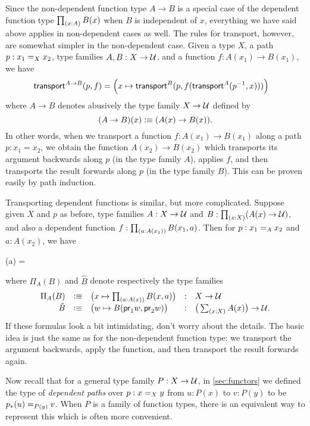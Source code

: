 Since the non-dependent function type $A\to B$ is a special case of the dependent function type $\prd{x:A} B(x)$ when $B$ is independent of $x$, everything we have said above applies in non-dependent cases as well.
The rules for transport, however, are somewhat simpler in the non-dependent case.
Given a type $X$, a path $p:\id[X]{x_1}{x_2}$, type families $A,B:X\to \type$, and a function $f : A(x_1) \to B(x_1)$,  we have
\begin{align}\label{eq:transport-arrow}
  \transfib{A\to B}{p}{f} &=
  \Big(x \mapsto \transfib{B}{p}{f(\transfib{A}{\opp p}{x})}\Big)
\end{align}
where $A\to B$ denotes abusively the type family $X\to \type$ defined by
\[(A\to B)(x) \defeq (A(x)\to B(x)).\]
In other words, when we transport a function $f:A(x_1)\to B(x_1)$ along a path $p:x_1=x_2$, we obtain the function $A(x_2)\to B(x_2)$ which transports its argument backwards along $p$ (in the type family $A$), applies $f$, and then transports the result forwards along $p$ (in the type family $B$).
This can be proven easily by path induction.

Transporting dependent functions is similar, but more complicated.
Suppose given $X$ and $p$ as before, type families $A:X\to \type$ and $B:\prd{x:X} (A(x)\to\type)$, and also a dependent function $f : \prd{a:A(x_1)} B(x_1,a)$.
Then for $p:\id[A]{x_1}{x_2}$ and $a:A(x_2)$, we have
\begin{narrowmultline*}
  (a) = \narrowbreak
\end{narrowmultline*}
where $\Pi_A(B)$ and $\hat{B}$ denote respectively the type families
\begin{equation}\label{eq:transport-arrow-families}
\begin{array}{rclcl}
\Pi_A(B) &\defeq& \big(x\mapsto \prd{a:A(x)} B(x,a) \big) &:& X\to \type\\
\hat{B} &\defeq& \big(w \mapsto B(\proj1w,\proj2w) \big) &:& \big(\sm{x:X} A(x)\big) \to \type.
\end{array}
\end{equation}
If these formulas look a bit intimidating, don't worry about the details.
The basic idea is just the same as for the non-dependent function type: we transport the argument backwards, apply the function, and then transport the result forwards again.

Now recall that for a general type family $P:X\to\type$, in \autoref{sec:functors} we defined the type of \emph{dependent paths} over $p:\id[X]xy$ from $u:P(x)$ to $v:P(y)$ to be $\id[P(y)]{\trans{p}{u}}{v}$.
When $P$ is a family of function types, there is an equivalent way to represent this which is often more convenient.

